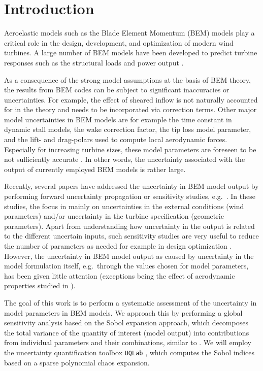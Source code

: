 
\section{Introduction}
Aeroelastic models such as the Blade Element Momentum (BEM) models \cite{HandBook} play a critical role in the design, development, and optimization of modern wind turbines. A large number of BEM models have been developed to predict turbine responses such as the structural loads and power output \cite{Vorpahl2013}. 

As a consequence of the strong model assumptions at the basis of BEM theory, the results from BEM codes can be subject to significant inaccuracies or uncertainties. For example, the effect of sheared inflow \cite{Madsen2012} is not naturally accounted for in the theory and needs to be incorporated via correction terms. Other major model uncertainties in BEM models are for example the time constant in dynamic stall models, the wake correction factor, the tip loss model parameter, and the lift- and drag-polars used to compute local aerodynamic forces. Especially for increasing turbine sizes, these model parameters are foreseen to be not sufficiently accurate \cite{Sayed2019}. In other words, the uncertainty associated with the output of currently employed BEM models is rather large. 

Recently, several papers have addressed the uncertainty in BEM model output by performing forward uncertainty propagation or sensitivity studies, e.g.\ \cite{Echeverria2017,Matthaus2017,Murcia2018,Robertson2018,Bos2019a}. In these studies, the focus in mainly on uncertainties in the external conditions (wind parameters) and/or uncertainty in the turbine specification (geometric parameters). Apart from understanding how uncertainty in the output is related to the different uncertain inputs, such sensitivity studies are very useful to reduce the number of parameters as needed for example in design optimization \cite{Echeverria2017}. However, the uncertainty in BEM model output as caused by uncertainty in the model formulation itself, e.g.\ through the values chosen for model parameters, has been given little attention (exceptions being the effect of aerodynamic properties studied in \cite{Bortolotti2019,Matthaus2017}).

The goal of this work is to perform a systematic assessment of the uncertainty in model parameters in BEM models. We approach this by performing a global sensitivity analysis based on the Sobol expansion approach, which decomposes the total variance of the quantity of interest (model output) into contributions from individual parameters and their combinations, similar to \cite{Echeverria2017,Murcia2018, Rinker2016a}. We will employ the uncertainty quantification toolbox \texttt{UQLab} \cite{uqlab}, which computes the Sobol indices based on a sparse polynomial chaos expansion. 

